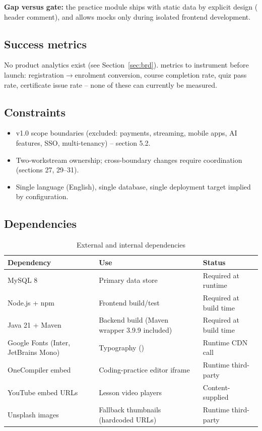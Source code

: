 \noindent \textbf{Gap versus gate:} the practice module ships with static data by explicit design ( header comment), and  allows mocks only during isolated frontend development. 

\subsection{Success metrics}

No product analytics exist (see Section~\ref{sec:brd}).  metrics to instrument before launch: registration$\rightarrow$enrolment conversion, course completion rate, quiz pass rate, certificate issue rate -- none of these can currently be measured.

\subsection{Constraints}

\begin{itemize}
    \item v1.0 scope boundaries (excluded: payments, streaming, mobile apps, AI features, SSO, multi-tenancy) --  section 5.2.
    \item Two-workstream ownership; cross-boundary changes require coordination (sections 27, 29--31).
    \item Single language (English), single database, single deployment target implied by configuration.
\end{itemize}

\subsection{Dependencies}

\begin{table}[H]
\centering
\caption{External and internal dependencies}
\label{tab:prd-dependencies}
\begin{tabular}{@{}L{5.0cm}L{7.6cm}C{2.2cm}@{}}
\toprule
\textbf{Dependency} & \textbf{Use} & \textbf{Status} \\
\midrule
MySQL 8 & Primary data store & Required at runtime \\
Node.js + npm & Frontend build/test & Required at build time \\
Java 21 + Maven & Backend build (Maven wrapper 3.9.9 included) & Required at build time \\
Google Fonts (Inter, JetBrains Mono) & Typography () & Runtime CDN call \\
OneCompiler embed & Coding-practice editor iframe & Runtime third-party \\
YouTube embed URLs & Lesson video players & Content-supplied \\
Unsplash images & Fallback thumbnails (hardcoded URLs) & Runtime third-party \\
\bottomrule
\end{tabular}
\end{table}

